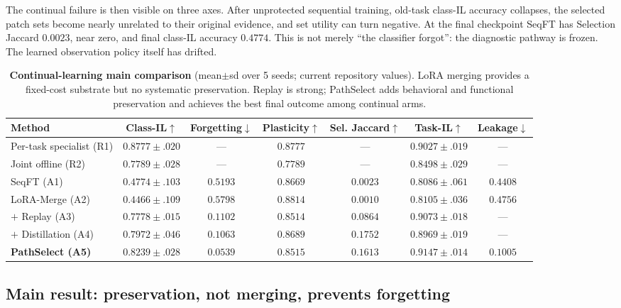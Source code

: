 \documentclass{article}
\begin{document}
The continual failure is then visible on three axes.
After unprotected sequential training, old-task class-IL accuracy collapses, the selected patch sets become nearly unrelated to their original evidence, and set utility can turn negative.
At the final checkpoint SeqFT has Selection Jaccard $0.0023$, near zero, and final class-IL accuracy $0.4774$.
This is not merely ``the classifier forgot'': the diagnostic pathway is frozen.
The learned observation policy itself has drifted.

\begin{table}[t]
\centering
\footnotesize
\caption{\textbf{Continual-learning main comparison} (mean$\pm$sd over 5 seeds; current repository values).
LoRA merging provides a fixed-cost substrate but no systematic preservation.
Replay is strong; PathSelect adds behavioral and functional preservation and achieves the best final outcome among continual arms.}
\label{tab:main}
\begin{tabular}{lcccccc}
\toprule
Method &
Class-IL$\uparrow$ &
Forgetting$\downarrow$ &
Plasticity$\uparrow$ &
Sel. Jaccard$\uparrow$ &
Task-IL$\uparrow$ &
Leakage$\downarrow$ \\
\midrule
Per-task specialist (R1) & $0.8777{\pm}.020$ & --- & $0.8777$ & --- & $0.9027{\pm}.019$ & --- \\
Joint offline (R2)       & $0.7789{\pm}.028$ & --- & $0.7789$ & --- & $0.8498{\pm}.029$ & --- \\
\midrule
SeqFT (A1)               & $0.4774{\pm}.103$ & $0.5193$ & $0.8669$ & $0.0023$ & $0.8086{\pm}.061$ & $0.4408$ \\
LoRA-Merge (A2)          & $0.4466{\pm}.109$ & $0.5798$ & $0.8814$ & $0.0010$ & $0.8105{\pm}.036$ & $0.4756$ \\
$+$ Replay (A3)          & $0.7778{\pm}.015$ & $0.1102$ & $0.8514$ & $0.0864$ & $0.9073{\pm}.018$ & --- \\
$+$ Distillation (A4)    & $0.7972{\pm}.046$ & $0.1063$ & $0.8689$ & $\mathbf{0.1752}$ & $0.8969{\pm}.019$ & --- \\
\textbf{PathSelect (A5)} & $\mathbf{0.8239{\pm}.028}$ & $\mathbf{0.0539}$ & $0.8515$ & $0.1613$ & $\mathbf{0.9147{\pm}.014}$ & $\mathbf{0.1005}$ \\
\bottomrule
\end{tabular}
\end{table}

\subsection{Main result: preservation, not merging, prevents forgetting}
\end{document}

